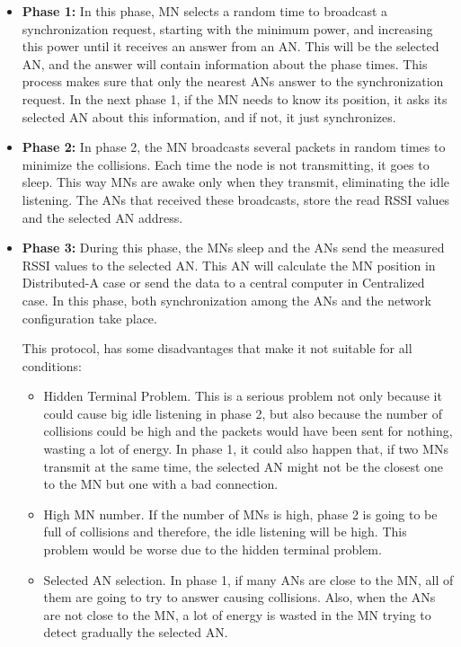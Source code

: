 \begin{itemize}
 \item \textbf{Phase 1:} In this phase, \ac{MN} selects a random time to broadcast a synchronization request, starting with the minimum power,
and increasing this power until it receives an answer from an \ac{AN}. This will be the selected \ac{AN}, and the answer will contain information
about the phase times. This process makes sure that only the nearest \acp{AN} answer to the synchronization request. In the next phase 1, if 
the \ac{MN} needs to know its position, it asks its selected \ac{AN} about this information, and if not, it just synchronizes.
 \item \textbf{Phase 2:} In phase 2, the \ac{MN} broadcasts several packets in random times to minimize the collisions. Each time the node is not
transmitting, it goes to sleep. This way \acp{MN} are awake only when they transmit, eliminating the idle listening. The \acp{AN} that
received these broadcasts, store the read \ac{RSSI} values and the selected \ac{AN} address.
 \item \textbf{Phase 3:} During this phase, the \acp{MN} sleep and the \acp{AN} send the measured \ac{RSSI} values to the selected \ac{AN}. 
This \ac{AN} will calculate the \ac{MN} position in Distributed-A case or send the data to a central computer in Centralized case. In this phase, both 
synchronization among the \acp{AN} and the network configuration take place.

This protocol, has some disadvantages that make it not suitable for all conditions:

\begin{itemize}
 \item Hidden Terminal Problem. This is a serious problem not only because it could cause big idle listening in phase 2, but also because the number
of collisions could be high and the packets would have been sent for nothing, wasting a lot of energy. In phase 1, it could also 
happen that, if two \acp{MN} transmit at the same time, the selected \ac{AN} might not be the closest one to the \ac{MN} but one with a bad connection.
 \item High \ac{MN} number. If the number of \acp{MN} is high, phase 2 is going to be full of collisions and therefore, the idle listening will be
high. This problem would be worse due to the hidden terminal problem.
 \item Selected \ac{AN} selection. In phase 1, if many \acp{AN} are close to the \ac{MN}, all of them are going to try to answer causing collisions. Also, 
when the \acp{AN} are not close to the \ac{MN}, a lot of energy is wasted in the \ac{MN} trying to detect gradually the selected \ac{AN}.
\end{itemize}


\end{itemize}


